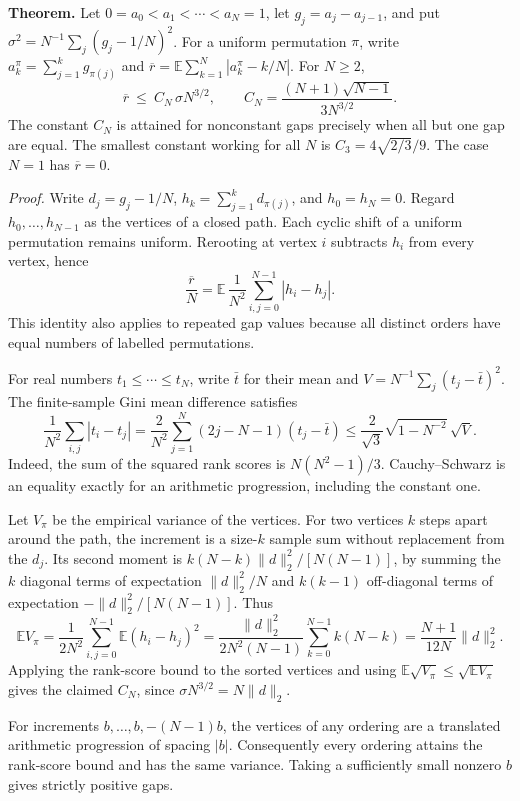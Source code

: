 \documentclass[11pt,a4paper]{article}
\begin{document}
\medskip\noindent\textbf{Theorem.}
Let $0=a_0<a_1<\cdots<a_N=1$, let $g_j=a_j-a_{j-1}$, and put
$\sigma^2=N^{-1}\sum_j(g_j-1/N)^2$. For a uniform permutation
$\pi$, write $a_k^{\pi}=\sum_{j=1}^k g_{\pi(j)}$ and
$\overline r=\mathbb E\sum_{k=1}^N|a_k^\pi-k/N|$.
For $N\ge2$,
\[
 \overline r\ \le\ C_N\,\sigma N^{3/2},\qquad
 C_N=\frac{(N+1)\sqrt{N-1}}{3N^{3/2}}.
\]
The constant $C_N$ is attained for nonconstant gaps precisely when
all but one gap are equal. The smallest constant working for all $N$
is $C_3=4\sqrt{2/3}/9$. The case $N=1$ has $\overline r=0$.

\medskip\noindent\emph{Proof.}
Write $d_j=g_j-1/N$, $h_k=\sum_{j=1}^k d_{\pi(j)}$, and $h_0=h_N=0$.
Regard $h_0,\ldots,h_{N-1}$ as the vertices of a closed path. Each
cyclic shift of a uniform permutation remains uniform. Rerooting at
vertex $i$ subtracts $h_i$ from every vertex, hence
\[
 \frac{\overline r}{N}
 =\mathbb E\,\frac{1}{N^2}\sum_{i,j=0}^{N-1}|h_i-h_j|.
\]
This identity also applies to repeated gap values because all distinct
orders have equal numbers of labelled permutations.

For real numbers $t_1\le\cdots\le t_N$, write $\bar t$ for their mean
and $V=N^{-1}\sum_j(t_j-\bar t)^2$. The finite-sample
Gini mean difference satisfies
\[
 \frac1{N^2}\sum_{i,j}|t_i-t_j|
 =\frac2{N^2}\sum_{j=1}^N (2j-N-1)(t_j-\bar t)
 \le \frac2{\sqrt3}\sqrt{1-N^{-2}}\,\sqrt V .
\]
Indeed, the sum of the squared rank scores is $N(N^2-1)/3$.
Cauchy--Schwarz is an equality exactly for an arithmetic progression,
including the constant one.

Let $V_\pi$ be the empirical variance of the vertices. For two vertices
$k$ steps apart around the path, the increment is a size-$k$ sample
sum without replacement from the $d_j$. Its second moment is
$k(N-k)\|d\|_2^2/[N(N-1)]$, by summing the $k$ diagonal terms of
expectation $\|d\|_2^2/N$ and $k(k-1)$ off-diagonal terms of
expectation $-\|d\|_2^2/[N(N-1)]$. Thus
\[
 \mathbb EV_\pi
 =\frac1{2N^2}\sum_{i,j=0}^{N-1}\mathbb E(h_i-h_j)^2
 =\frac{\|d\|_2^2}{2N^2(N-1)}
       \sum_{k=0}^{N-1}k(N-k)
 =\frac{N+1}{12N}\|d\|_2^2.
\]
Applying the rank-score bound to the sorted vertices and using
$\mathbb E\sqrt{V_\pi}\le\sqrt{\mathbb E V_\pi}$ gives the claimed
$C_N$, since $\sigma N^{3/2}=N\|d\|_2$.

For increments $b,\ldots,b,-(N-1)b$, the vertices of any ordering
are a translated arithmetic progression of spacing $|b|$. Consequently
every ordering attains the rank-score bound and has the same variance.
Taking a sufficiently small nonzero $b$ gives strictly positive gaps.
\end{document}
